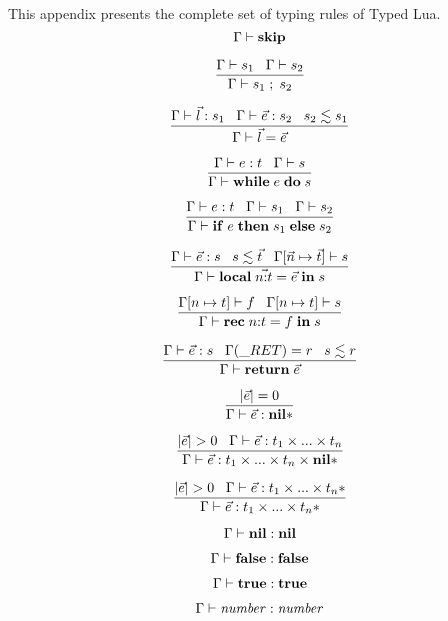 This appendix presents the complete set of typing rules of Typed Lua.
\\

\[
\Gamma \vdash \mathbf{skip}
\]

\[
\dfrac{\Gamma \vdash s_{1} \;\;\;
       \Gamma \vdash s_{2}}
      {\Gamma \vdash s_{1} \; ; \; s_{2}}
\]

\[
\dfrac{\Gamma \vdash \vec{l}:s_{1} \;\;\;
       \Gamma \vdash \vec{e}:s_{2} \;\;\;
       s_{2} \lesssim s_{1}}
      {\Gamma \vdash \vec{l} = \vec{e}}
\]

\[
\dfrac{\Gamma \vdash e:t \;\;\;
       \Gamma \vdash s}
      {\Gamma \vdash \mathbf{while} \; e \; \mathbf{do} \; s}
\]

\[
\dfrac{\Gamma \vdash e:t \;\;\;
       \Gamma \vdash s_{1} \;\;\;
       \Gamma \vdash s_{2}}
      {\Gamma \vdash \mathbf{if} \; e \; \mathbf{then} \; s_{1} \; \mathbf{else} \; s_{2}}
\]

\[
\dfrac{\Gamma \vdash \vec{e}:s \;\;\;
       s \lesssim \vec{t} \;\;\;
       \Gamma[\vec{n} \mapsto \vec{t}] \vdash s}
      {\Gamma \vdash \mathbf{local} \; \vec{n{:}t} = \vec{e} \; \mathbf{in} \; s}
\]

\[
\dfrac{\Gamma[n \mapsto t] \vdash f \;\;\;
       \Gamma[n \mapsto t] \vdash s}
      {\Gamma \vdash \mathbf{rec} \; n{:}t = f \; \mathbf{in} \; s}
\]

\[
\dfrac{\env \vdash \vec{e}:s \;\;\;
       \env(\ret) = r \;\;\;
       s \lesssim r}
      {\env \vdash \mathbf{return} \; \vec{e}}
\]

\[
\dfrac{|\vec{e}| = 0}
      {\Gamma \vdash \vec{e}:\mathbf{nil}{*}}
\]

\[
\dfrac{|\vec{e}| > 0 \;\;\;
       \Gamma \vdash \vec{e}:t_{1} \times ... \times t_{n}}
      {\Gamma \vdash \vec{e}:t_{1} \times ... \times t_{n} \times \mathbf{nil}{*}}
\]

\[
\dfrac{|\vec{e}| > 0 \;\;\;
       \Gamma \vdash \vec{e}:t_{1} \times ... \times t_{n}{*}}
      {\Gamma \vdash \vec{e}:t_{1} \times ... \times t_{n}{*}}
\]

\[
\Gamma \vdash \mathbf{nil}:\mathbf{nil}
\]

\[
\Gamma \vdash \mathbf{false}:\mathbf{false}
\]

\[
\Gamma \vdash \mathbf{true}:\mathbf{true}
\]

\[
\Gamma \vdash {\it number}:{\it number}
\]

